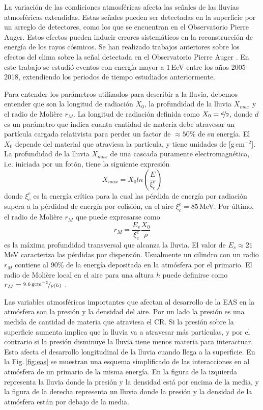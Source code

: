 La variación de las condiciones atmosféricas afecta las señales de las lluvias atmosféricas extendidas. Estas señales pueden ser detectadas en la superficie por un arreglo de detectores, como los que se encuentran en el Observatorio Pierre Auger. Estos efectos pueden inducir errores sistemáticos en la reconstrucción de energía de los rayos cósmicos. Se han realizado  trabajos anteriores sobre los efectos del clima sobre la señal detectada en el Observatorio Pierre Auger \cite{collaboration2009atmospheric} \cite{aab2017impact}. En este trabajo se estudió eventos con energía mayor a $1\,$EeV entre los años 2005-2018, extendiendo los periodos de tiempo estudiados anteriormente.

Para entender los parámetros utilizados para describir a la lluvia, debemos entender que son la longitud de radiación $X_0$, la profundidad de la lluvia $X_{max}$ y el radio de Molière $r_M$. La longitud de radiación definida como $X_0=\nicefrac{d}{2}$,  donde $d$ es un parámetro que indica cuanta cantidad de materia debe atravesar un partícula cargada relativista para perder un factor de $\approx 50\%$ de su  energía. El $X_0$ depende del material que atraviesa la partícula, y tiene unidades de [g\,cm$^{-2}$]. La profundidad de la lluvia $X_{max}$ de una cascada puramente electromagnética, i.e. iniciada por un fotón, tiene la siguiente expresión \cite{matthews2005heitler}
\begin{equation}
 	X_{max} = X_0{ln(\frac{E}{\xi^e_c})}
 \end{equation} 
donde  $\xi^e_c$ es la energía crítica para la cual las pérdida de energía por radiación supera a la pérdidad de energía por colisión, en el aire $\xi^e_c=85\,$MeV. Por último, el radio de Molière $r_M$ que puede expresarse como 
\begin{equation}
	r_M= \frac{E_s}{\xi^e_c}\frac{X_0}{\rho}
\end{equation}
es la máxima profundidad transversal que alcanza la lluvia. El valor de $E_s\approx21\,$MeV caracteriza las pérdidas por dispersión. Usualmente un cilindro con un radio $r_M$ contiene al 90\% de la energía depositada en la atmósfera por el primario. El radio de Molière local en el aire para una altura $h$ puede definirse como $r_M = \nicefrac{9.6\,\text{gcm}^{-2}}{\rho(h)}$ \cite{gora2006universal}. 

Las variables atmosféricas importantes que afectan al desarrollo de la EAS en la atmósfera son la presión y la densidad del aire. Por un lado la presión es una medida de cantidad de materia que atraviesa el CR. Si la presión sobre la superficie aumenta implica que la lluvia va a atravesar más partículas, y por el contrario si la presión disminuye la lluvia tiene menos materia para interactuar. Esto afecta el desarrollo longitudinal de la lluvia cuando llega a la superficie. En la Fig.\,\ref{fig:eas} se muestran una esquema simplificado de las interacciones en al atmósfera de un primario de la misma energía. En la figura de la izquierda representa la lluvia donde la presión y la densidad está por encima de la media, y la figura de la derecha representa un lluvia donde la presión y la densidad de la atmósfera están por debajo de la media.

